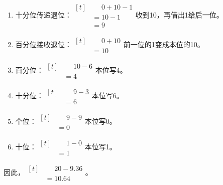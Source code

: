 {\begin{enumerate}[leftmargin=1.7em,itemsep=5pt,topsep=0pt]
\item 十分位传递退位：\(\begin{aligned}[t]&\phantom{={}}0+10-1\\&=10-1\\&=9\end{aligned}\)\quad 收到10，再借出1给后一位。
\item 百分位接收退位：\(\begin{aligned}[t]&\phantom{={}}0+10\\&=10\end{aligned}\)\quad 前一位的1变成本位的10。
\item 百分位：\(\begin{aligned}[t]&\phantom{={}}10-6\\&=4\end{aligned}\)\quad 本位写4。
\item 十分位：\(\begin{aligned}[t]&\phantom{={}}9-3\\&=6\end{aligned}\)\quad 本位写6。
\item 个位：\(\begin{aligned}[t]&\phantom{={}}9-9\\&=0\end{aligned}\)\quad 本位写0。
\item 十位：\(\begin{aligned}[t]&\phantom{={}}1-0\\&=1\end{aligned}\)\quad 本位写1。
\end{enumerate}
\par\smallskip
因此，\(\begin{aligned}[t]&\phantom{={}}20-9.36\\&=10.64\end{aligned}\)。
\par\medskip

}

